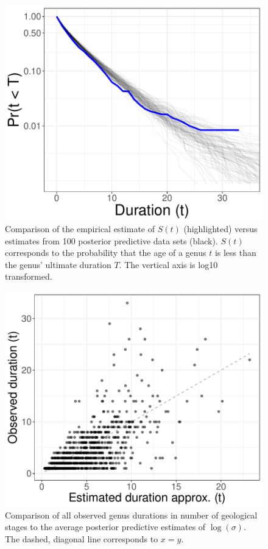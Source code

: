 \documentclass{article}
\begin{document}
\clearpage


\begin{figure}[ht]
  \centering
  \includegraphics[height = 0.5\textheight,width=\textwidth,keepaspectratio=true]{figure/survival_curves}
  \caption{Comparison of the empirical estimate of \(S(t)\) (highlighted) versus estimates from 100 posterior predictive data sets (black). \(S(t)\) corresponds to the probability that the age of a genus \(t\) is less than the genus' ultimate duration \(T\). The vertical axis is log10 transformed.}
  \label{fig:surv}
\end{figure}


\begin{figure}[ht]
  \centering
  \includegraphics[height = 0.5\textheight,width=\textwidth,keepaspectratio=true]{figure/shotgun}
  \caption{Comparison of all observed genus durations in number of geological stages to the average posterior predictive estimates of \(\log(\sigma)\). The dashed, diagonal line corresponds to \(x = y\).}
  \label{fig:shot}
\end{figure}
\end{document}
